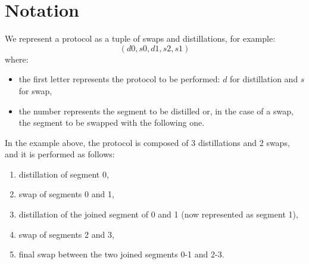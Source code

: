 \documentclass{article}
\begin{document}
\section*{Notation}

We represent a protocol as a tuple of swaps and distillations, for example:
\begin{equation*}
    (d0, s0, d1, s2, s1)
\end{equation*}
where:
\begin{itemize}
    \item the first letter represents the protocol to be performed: \(d\) for distillation and \(s\) for swap,
    \item the number represents the segment to be distilled or, in the case of a swap, the segment to be swapped with the following one.
\end{itemize}
In the example above, the protocol is composed of 3 distillations and 2 swaps, and it is performed as follows:
\begin{enumerate}
    \item distillation of segment 0,
    \item swap of segments 0 and 1,
    \item distillation of the joined segment of 0 and 1 (now represented as segment 1),
    \item swap of segments 2 and 3,
    \item final swap between the two joined segments 0-1 and 2-3.
\end{enumerate}
\end{document}
